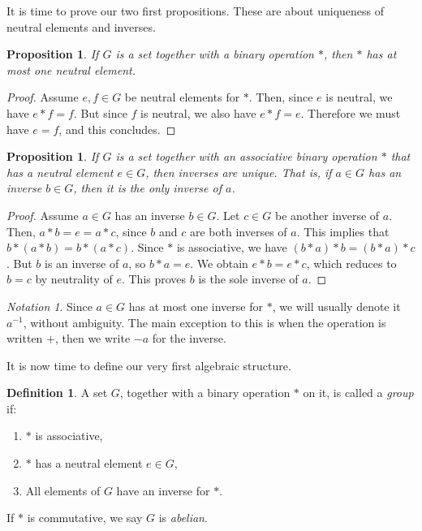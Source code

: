 \documentclass{book}
\theoremstyle{plain}
\newtheorem{proposition}[theorem]{Proposition}
\theoremstyle{definition}
\newtheorem{definition}[theorem]{Definition}
\theoremstyle{remark}
\newtheorem*{notation}{Notation}
\begin{document}
It is time to prove our two first propositions. These are about uniqueness of neutral elements and inverses.

\begin{proposition}
    If $G$ is a set together with a binary operation $*$, then $*$ has at most one neutral element.
\end{proposition}

\begin{proof}
    Assume $e,f \in G$ be neutral elements for $*$. Then, since $e$ is neutral, we have $e * f = f$. But since $f$ is neutral, we also have $e * f = e$. Therefore we must have $e = f$, and this concludes.
\end{proof}

\begin{proposition}
    If $G$ is a set together with an associative binary operation $*$ that has a neutral element $e\in G$, then inverses are unique. That is, if $a \in G$ has an inverse $b\in G$, then it is the only inverse of $a$.
\end{proposition}

\begin{proof}
    Assume $a \in G$ has an inverse $b \in G$. Let $c \in G$ be another inverse of $a$. Then, $a * b = e = a *c$, since $b$ and $c$ are both inverses of $a$. This implies that $b * (a * b) = b * (a * c)$. Since $*$ is associative, we have $(b * a) * b = (b * a) * c$. But $b$ is an inverse of $a$, so $b * a = e$. We obtain $e * b = e * c$, which reduces to $b = c$ by neutrality of $e$. This proves $b$ is the sole inverse of $a$.
\end{proof}

\begin{notation}
    Since $a \in G$ has at most one inverse for $*$, we will usually denote it $a^{-1}$, without ambiguity. The main exception to this is when the operation is written $+$, then we write $-a$ for the inverse.
\end{notation}

It is now time to define our very first algebraic structure.

\begin{definition}
    A set $G$, together with a binary operation $*$ on it, is called a \emph{group} if:
    \begin{enumerate}
        \item $*$ is associative,
        \item $*$ has a neutral element $e \in G$,
        \item All elements of $G$ have an inverse for $*$.
    \end{enumerate}
    If $*$ is commutative, we say $G$ is \emph{abelian}.
\end{definition}
\end{document}
